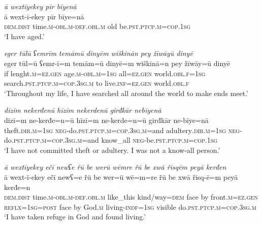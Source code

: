 \ea \label{ŽM.10}
\textit{ā wextīyekey pīr bīyenā} \\ 
\gll ā wext-ī-ekey pīr bīye=nā \\ 
 \textsc{dem.dist} time\textsc{.m}\textsc{-obl}\textsc{.m}\textsc{-def}\textsc{.obl}\textsc{.m} old be\textsc{.pst}\textsc{.ptcp}\textsc{.m}\textsc{=cop}\textsc{.\textsc{1sg}} \\ 
\glt `I have aged.'
\z 
 
\ea \label{ŽM.13}
\textit{eger tūlū ʕemrīm temāmū dinyēm wiškinān pey žīwāyū dinyē} \\ 
\gll eger tūl=ū ʕemr-ī=m temām=ū dinyē=m wiškinā=n pey žīwāy=ū dinyē \\ 
 if lenght\textsc{.m}\textsc{=ez.gen} age\textsc{.m}\textsc{-obl}\textsc{.m}\textsc{=\textsc{1sg}} all\textsc{=ez.gen} world\textsc{.obl}\textsc{.f}\textsc{=\textsc{1sg}} search\textsc{.pst}\textsc{.ptcp}\textsc{.m}\textsc{=cop}\textsc{.3sg}\textsc{.m} to live\textsc{.inf}\textsc{=ez.gen} world\textsc{.obl}\textsc{.f} \\ 
\glt `Throughout my life, I have searched all around the world to make ends meet.'
\z 
 
\ea \label{ŽM.14}
\textit{dizīm nekerđenū hīzīm nekerdenū girđkār nebīyenā} \\ 
\gll dizī=m ne-kerđe=n=ū hīzī=m ne-kerde=n=ū girđkār ne-bīye=nā \\ 
 theft\textsc{.dir}\textsc{.m}\textsc{=\textsc{1sg}} \textsc{neg-}do\textsc{.pst}\textsc{.ptcp}\textsc{.m}\textsc{=cop}\textsc{.3sg}\textsc{.m}=and adultery\textsc{.dir}\textsc{.m}\textsc{=\textsc{1sg}} \textsc{neg-}do\textsc{.pst}\textsc{.ptcp}\textsc{.m}\textsc{=cop}\textsc{.3sg}\textsc{.m}=and know\_all \textsc{neg-}be\textsc{.pst}\textsc{.ptcp}\textsc{.m}\textsc{=cop}\textsc{.\textsc{1sg}} \\ 
\glt `I have not committed theft or adultery. I was not a know-all person.'
\z 
 
\ea \label{ŽM.15}
\textit{ā wextīyekey ečī newʕe řū be werū wēmre řū be xwā řisqēm peyā kerđen} \\ 
\gll ā wext-ī-ekey ečī newʕ=e řū be wer=ū wē=m=re řū be xwā řisq-ē=m peyā kerđe=n \\ 
 \textsc{dem.dist} time\textsc{.m}\textsc{-obl}\textsc{.m}\textsc{-def}\textsc{.obl}\textsc{.m} like\_this kind/way\textsc{=dem} face by front\textsc{.m}\textsc{=ez.gen} \textsc{reflx}\textsc{=\textsc{1sg}}\textsc{=\textsc{post}} face by God\textsc{.m} living\textsc{-indf}\textsc{=\textsc{1sg}} visible do\textsc{.pst}\textsc{.ptcp}\textsc{.m}\textsc{=cop}\textsc{.3sg}\textsc{.m} \\ 
\glt `I have taken refuge in God and found living.'
\z 
 

